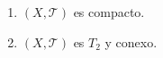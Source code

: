 \documentclass[12pt]{article}
\newcounter{ejercicio}[section] %
\newcounter{ejercicio}
\begin{document}
\begin{ejercicio}[3 puntos]
\begin{enumerate}[label=(\alph*)]
            \item $(X,\mathcal{T})$ es compacto.
            \item $(X,\mathcal{T})$ es $T_2$ y conexo.
        \end{enumerate}
    \end{ejercicio}
\end{document}
